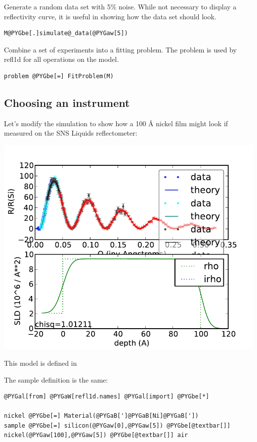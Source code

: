 \documentclass[letterpaper,10pt,english]{sphinxmanual}
\begin{document}
Generate a random data set with 5\% noise. While not necessary
to display a reflectivity curve, it is useful in showing how
the data set should look.

\begin{Verbatim}[commandchars=@\[\]]
M@PYGbe[.]simulate@_data(@PYGaw[5])
\end{Verbatim}

Combine a set of experiments into a fitting problem.  The problem
is used by refl1d for all operations on the model.

\begin{Verbatim}[commandchars=@\[\]]
problem @PYGbe[=] FitProblem(M)
\end{Verbatim}


\subsection{Choosing an instrument}
\label{examples/ex1/nifilm-tof:choosing-an-instrument}\label{examples/ex1/nifilm-tof::doc}
Let's modify the simulation to show how a 100 Å nickel film might
look if measured on the SNS Liquids reflectometer:

\includegraphics{9027665fb3.pdf}

This model is defined in 

The sample definition is the same:

\begin{Verbatim}[commandchars=@\[\]]
@PYGal[from] @PYGaW[refl1d.names] @PYGal[import] @PYGbe[*]

nickel @PYGbe[=] Material(@PYGaB[']@PYGaB[Ni]@PYGaB['])
sample @PYGbe[=] silicon(@PYGaw[0],@PYGaw[5]) @PYGbe[@textbar[]] nickel(@PYGaw[100],@PYGaw[5]) @PYGbe[@textbar[]] air
\end{Verbatim}
\end{document}
